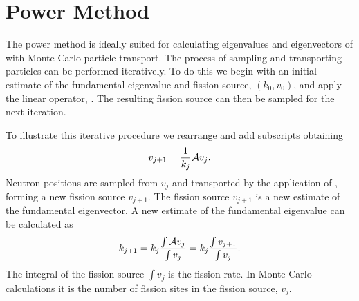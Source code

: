 \section{Power Method \label{sec:PowerMethod}}
The power method is ideally suited for calculating eigenvalues and eigenvectors of \A{} with Monte Carlo particle transport.  The process of sampling and transporting particles can be performed iteratively.  To do this we begin with an initial estimate of the fundamental eigenvalue and fission source, $\left(k_0, v_0\right)$, and apply the linear operator, \A.  The resulting fission source can then be sampled for the next iteration.

To illustrate this iterative procedure we rearrange  and add subscripts obtaining
\begin{equation}
    v_{j+1} = \frac{1}{k_{j}}\mathcal{A} v_j. \label{eq:eVectorIterative}
\end{equation}
Neutron positions are sampled from $v_j$ and transported by the application of \A, forming a new fission source $v_{j+1}$.  The fission source $v_{j+1}$ is a new estimate of the fundamental eigenvector.  A new estimate of the fundamental eigenvalue can be calculated as
\begin{equation}
    k_{j+1} = k_j\frac{\int \mathcal{A} v_j}{\int v_j} = k_j \frac{\int v_{j+1}}{\int v_j}.
    \label{eq:eValueIterative}
\end{equation}
The integral of the fission source $\int v_j$ is the fission rate.  In Monte Carlo calculations it is the number of fission sites in the fission source, $v_j$.

